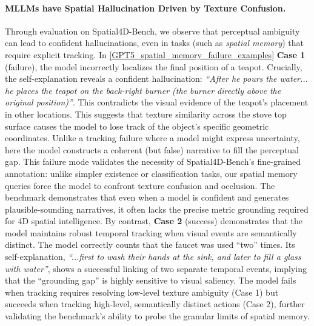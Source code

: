\paragraph{MLLMs have Spatial Hallucination Driven by Texture Confusion.}
Through evaluation on Spatial4D-Bench, we observe that perceptual ambiguity can lead to confident hallucinations, even in tasks (such as \textit{spatial memory}) that require explicit tracking.
In \cref{GPT5_spatial_memory_failure_examples} \textbf{Case 1} (failure), the model incorrectly localizes the final position of a teapot. 
Crucially, the self-explanation reveals a confident hallucination: \textit{``After he pours the water... he places the teapot on the back-right burner (the burner directly above the original position)''}.
This contradicts the visual evidence of the teapot's placement in other locations.
This suggests that texture similarity across the stove top surface causes the model to lose track of the object's specific geometric coordinates.
Unlike a tracking failure where a model might express uncertainty, here the model constructs a coherent (but false) narrative to fill the perceptual gap.
This failure mode validates the necessity of Spatial4D-Bench's fine-grained annotation: unlike simpler existence or classification tasks, our spatial memory queries force the model to confront texture confusion and occlusion.
The benchmark demonstrates that even when a model is confident and generates plausible-sounding narratives, it often lacks the precise metric grounding required for 4D spatial intelligence.
By contrast, \textbf{Case 2} (success) demonstrates that the model maintains robust temporal tracking when visual events are semantically distinct.
The model correctly counts that the faucet was used ``two'' times.
Its self-explanation, \textit{``...first to wash their hands at the sink, and later to fill a glass with water''}, shows a successful linking of two separate temporal events, implying that the ``grounding gap'' is highly sensitive to visual saliency.
The model fails when tracking requires resolving low-level texture ambiguity (Case 1) but succeeds when tracking high-level, semantically distinct actions (Case 2), further validating the benchmark's ability to probe the granular limits of spatial memory.




